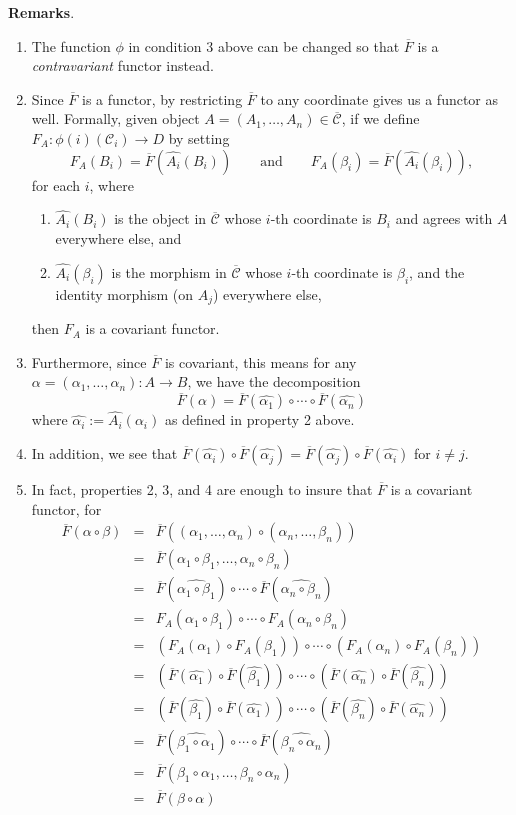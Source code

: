 \documentclass[12pt]{article}
\begin{document}
\textbf{Remarks}.
\begin{enumerate}
\item The function $\phi$ in condition 3 above can be changed so that $\overline{F}$ is a \emph{contravariant} functor instead.
\item Since $\overline{F}$ is a functor, by restricting $\overline{F}$ to any coordinate gives us a functor as well.  Formally, given object $A=(A_1,\ldots,A_n) \in \overline{\mathcal{C}}$, if we define $F_A:\phi(i)(\mathcal{C}_i)\to D$ by setting $$F_A(B_i)= \overline{F}(\hat{A_i}(B_i))\qquad \mbox{and}\qquad  F_A(\beta_i)= \overline{F}(\hat{A_i}(\beta_i)),$$ for each $i$, where 
\begin{enumerate}
\item $\hat{A_i}(B_i)$ is the object in $\overline{\mathcal{C}}$ whose $i$-th coordinate is $B_i$ and agrees with $A$ everywhere else, and 
\item $\hat{A_i}(\beta_i)$ is the morphism in $\overline{\mathcal{C}}$ whose $i$-th coordinate is $\beta_i$, and the identity morphism (on $A_j$) everywhere else, 
\end{enumerate}
then $F_A$ is a covariant functor.
\item Furthermore, since $\overline{F}$ is covariant, this means for any $\alpha=(\alpha_1,\ldots, \alpha_n): A\to B$, we have the decomposition $$\overline{F}(\alpha)= \overline{F}(\hat{\alpha_1})\circ \cdots \circ \overline{F}(\hat{\alpha_n})$$
where $\hat{\alpha_i}:=\hat{A_i}(\alpha_i)$ as defined in property 2 above.
\item In addition, we see that $\overline{F}(\hat{\alpha_i})\circ \overline{F}(\hat{\alpha_j}) = \overline{F}(\hat{\alpha_j}) \circ \overline{F}(\hat{\alpha_i})$ for $i\ne j$.
\item In fact, properties 2, 3, and 4 are enough to insure that $\overline{F}$ is a covariant functor, for 
\begin{eqnarray*}
\overline{F}(\alpha\circ \beta) &=& \overline{F}((\alpha_1,\ldots,\alpha_n)\circ (\alpha_n,\ldots, \beta_n)) \\ &=& \overline{F}(\alpha_1\circ \beta_1,\ldots, \alpha_n\circ \beta_n) \\ &=& \overline{F}(\widehat{\alpha_1\circ \beta_1})\circ \cdots \circ \overline{F}(\widehat{\alpha_n\circ \beta_n}) \\ &=& F_A(\alpha_1\circ \beta_1)\circ \cdots \circ F_A(\alpha_n\circ \beta_n) \\ &=& (F_A(\alpha_1)\circ F_A(\beta_1))\circ \cdots \circ (F_A(\alpha_n)\circ F_A(\beta_n)) \\ &=& (\overline{F}(\hat{\alpha_1})\circ \overline{F}(\hat{\beta_1}))\circ \cdots \circ (\overline{F}(\hat{\alpha_n})\circ \overline{F}(\hat{\beta_n})) \\ &=& (\overline{F}(\hat{\beta_1})\circ \overline{F}(\hat{\alpha_1}))\circ \cdots \circ (\overline{F}(\hat{\beta_n})\circ \overline{F}(\hat{\alpha_n})) \\ &=& \overline{F}(\widehat{\beta_1\circ \alpha_1})\circ \cdots \circ \overline{F}(\widehat{\beta_n\circ \alpha_n}) \\ &=& \overline{F}(\beta_1\circ \alpha_1,\ldots, \beta_n\circ \alpha_n) \\ &=& \overline{F}(\beta\circ \alpha)

\end{eqnarray*}
\end{enumerate}
\end{document}
